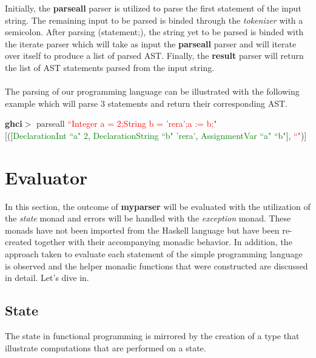 \documentclass[a4paper, onecolumn]{article}
\begin{document}
    \noindent Initially, the \textbf{parse\textunderscore all} parser is utilized to parse the first statement of the input string. The remaining input to be parsed is binded through the \textit{tokenizer} with a semicolon. After parsing (statement;), the string yet to be parsed is binded with the iterate parser which will take as input the \textbf{parse\textunderscore all} parser and will iterate over itself to produce a list of parsed AST. Finally, the \textbf{result} parser will return the list of AST statements parsed from the input string. \\ \\
    The parsing of our programming language can be illustrated with the following example which will parse 3 statements and return their corresponding AST.
    
    \begin{center}
            \textbf{ghci$>$} parse\textunderscore all \textcolor{red}{``Integer a = 2;String b = 'rera';a := b;"} \\
             $\big[$($\big[$\textcolor{green}{DeclarationInt ``a" 2}, \textcolor{green}{DeclarationString ``b" 'rera'}, \textcolor{green}{AssignmentVar ``a" ``b"}$\big]$, \textcolor{red}{``"})]
        \end{center}
        
    \section{Evaluator}
    
    In this section, the outcome of \textbf{my\textunderscore parser} will be evaluated with the utilization of the \textit{state} monad and errors will be handled with the \textit{exception} monad. These monads have not been imported from the Haskell language but have been re-created together with their accompanying monadic behavior. In addition, the approach taken to evaluate each statement of the simple programming language is observed and the helper monadic functions that were constructed are discussed in detail. Let's dive in. 
    
    \subsection{State}
    
    The state in functional programming is mirrored by the creation of a type that illustrate computations that are performed on a state. 
    
\end{document}

